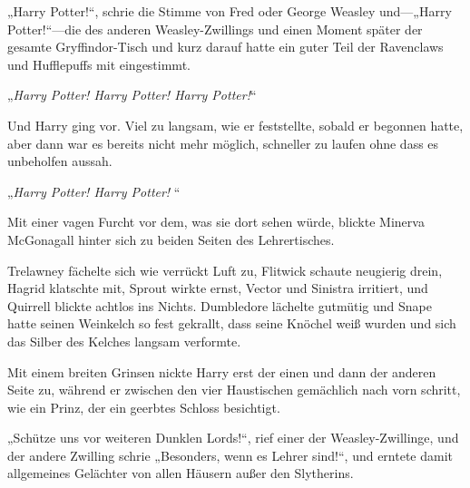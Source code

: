 „Harry Potter!“, schrie die Stimme von Fred oder George Weasley und—„Harry Potter!“—die des anderen Weasley-Zwillings und einen Moment später der gesamte Gryffindor-Tisch und kurz darauf hatte ein guter Teil der Ravenclaws und Hufflepuffs mit eingestimmt.

„\emph{Harry Potter! Harry Potter! Harry Potter!}“

Und Harry ging vor. Viel zu langsam, wie er feststellte, sobald er begonnen hatte, aber dann war es bereits nicht mehr möglich, schneller zu laufen ohne dass es unbeholfen aussah.

\later

„\emph{Harry Potter! Harry Potter! }“


Mit einer vagen Furcht vor dem, was sie dort sehen würde, blickte Minerva McGonagall hinter sich zu beiden Seiten des Lehrertisches.

Trelawney fächelte sich wie verrückt Luft zu, Flitwick schaute neugierig drein, Hagrid klatschte mit, Sprout wirkte ernst, Vector und Sinistra irritiert, und Quirrell blickte achtlos ins Nichts. Dumbledore lächelte gutmütig und Snape hatte seinen Weinkelch so fest gekrallt, dass seine Knöchel weiß wurden und sich das Silber des Kelches langsam verformte.

Mit einem breiten Grinsen nickte Harry erst der einen und dann der anderen Seite zu, während er zwischen den vier Haustischen gemächlich nach vorn schritt, wie ein Prinz, der ein geerbtes Schloss besichtigt.

„Schütze uns vor weiteren Dunklen Lords!“, rief einer der Weasley-Zwillinge, und der andere Zwilling schrie „Besonders, wenn es Lehrer sind!“, und erntete damit allgemeines Gelächter von allen Häusern außer den Slytherins.

